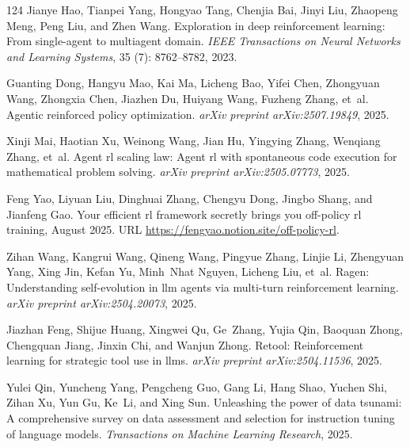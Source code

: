 \documentclass[]{youtu} %
\begin{document}
\begin{thebibliography}{124}
Jianye Hao, Tianpei Yang, Hongyao Tang, Chenjia Bai, Jinyi Liu, Zhaopeng Meng, Peng Liu, and Zhen Wang.
\newblock Exploration in deep reinforcement learning: From single-agent to multiagent domain.
\newblock \emph{IEEE Transactions on Neural Networks and Learning Systems}, 35 (7): 8762--8782, 2023.

Guanting Dong, Hangyu Mao, Kai Ma, Licheng Bao, Yifei Chen, Zhongyuan Wang, Zhongxia Chen, Jiazhen Du, Huiyang Wang, Fuzheng Zhang, et~al.
\newblock Agentic reinforced policy optimization.
\newblock \emph{arXiv preprint arXiv:2507.19849}, 2025{}.

Xinji Mai, Haotian Xu, Weinong Wang, Jian Hu, Yingying Zhang, Wenqiang Zhang, et~al.
\newblock Agent rl scaling law: Agent rl with spontaneous code execution for mathematical problem solving.
\newblock \emph{arXiv preprint arXiv:2505.07773}, 2025.

Feng Yao, Liyuan Liu, Dinghuai Zhang, Chengyu Dong, Jingbo Shang, and Jianfeng Gao.
\newblock Your efficient rl framework secretly brings you off-policy rl training, August 2025.
\newblock URL \url{https://fengyao.notion.site/off-policy-rl}.

Zihan Wang, Kangrui Wang, Qineng Wang, Pingyue Zhang, Linjie Li, Zhengyuan Yang, Xing Jin, Kefan Yu, Minh~Nhat Nguyen, Licheng Liu, et~al.
\newblock Ragen: Understanding self-evolution in llm agents via multi-turn reinforcement learning.
\newblock \emph{arXiv preprint arXiv:2504.20073}, 2025{}.

Jiazhan Feng, Shijue Huang, Xingwei Qu, Ge~Zhang, Yujia Qin, Baoquan Zhong, Chengquan Jiang, Jinxin Chi, and Wanjun Zhong.
\newblock Retool: Reinforcement learning for strategic tool use in llms.
\newblock \emph{arXiv preprint arXiv:2504.11536}, 2025{}.

Yulei Qin, Yuncheng Yang, Pengcheng Guo, Gang Li, Hang Shao, Yuchen Shi, Zihan Xu, Yun Gu, Ke~Li, and Xing Sun.
\newblock Unleashing the power of data tsunami: A comprehensive survey on data assessment and selection for instruction tuning of language models.
\newblock \emph{Transactions on Machine Learning Research}, 2025{}.


\end{thebibliography}
\end{document}
